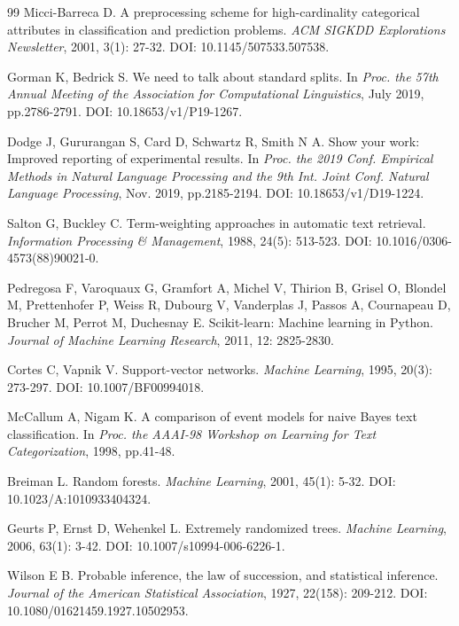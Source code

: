 \begin{thebibliography}{99}
Micci-Barreca D. A preprocessing scheme for high-cardinality categorical
attributes in classification and prediction problems. \emph{ACM SIGKDD
Explorations Newsletter}, 2001, 3(1): 27-32. DOI: 10.1145/507533.507538.

Gorman K, Bedrick S. We need to talk about standard splits. In \emph{Proc. the
57th Annual Meeting of the Association for Computational Linguistics}, July
2019, pp.2786-2791. DOI: 10.18653/v1/P19-1267.

Dodge J, Gururangan S, Card D, Schwartz R, Smith N A. Show your work: Improved
reporting of experimental results. In \emph{Proc. the 2019 Conf. Empirical
Methods in Natural Language Processing and the 9th Int. Joint Conf. Natural
Language Processing}, Nov. 2019, pp.2185-2194. DOI: 10.18653/v1/D19-1224.

Salton G, Buckley C. Term-weighting approaches in automatic text retrieval.
\emph{Information Processing \& Management}, 1988, 24(5): 513-523.
DOI: 10.1016/0306-4573(88)90021-0.

Pedregosa F, Varoquaux G, Gramfort A, Michel V, Thirion B, Grisel O, Blondel M,
Prettenhofer P, Weiss R, Dubourg V, Vanderplas J, Passos A, Cournapeau D,
Brucher M, Perrot M, Duchesnay E. Scikit-learn: Machine learning in Python.
\emph{Journal of Machine Learning Research}, 2011, 12: 2825-2830.

Cortes C, Vapnik V. Support-vector networks. \emph{Machine Learning}, 1995,
20(3): 273-297. DOI: 10.1007/BF00994018.

McCallum A, Nigam K. A comparison of event models for naive Bayes text
classification. In \emph{Proc. the AAAI-98 Workshop on Learning for Text
Categorization}, 1998, pp.41-48.

Breiman L. Random forests. \emph{Machine Learning}, 2001, 45(1): 5-32.
DOI: 10.1023/A:1010933404324.

Geurts P, Ernst D, Wehenkel L. Extremely randomized trees. \emph{Machine
Learning}, 2006, 63(1): 3-42. DOI: 10.1007/s10994-006-6226-1.

Wilson E B. Probable inference, the law of succession, and statistical
inference. \emph{Journal of the American Statistical Association}, 1927,
22(158): 209-212. DOI: 10.1080/01621459.1927.10502953.

\end{thebibliography}
